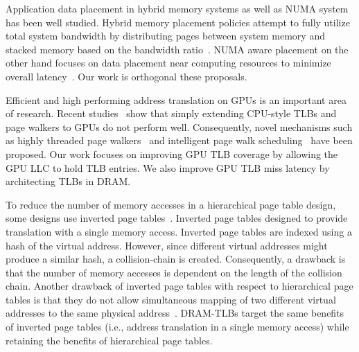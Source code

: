  Application data
placement in hybrid memory systems as well as NUMA system has been
well studied. Hybrid memory placement policies attempt to fully
utilize total system bandwidth by distributing pages between system
memory and stacked memory based on the bandwidth
ratio~\cite{bwa,batman}. NUMA aware placement on the other hand
focuses on data placement near computing resources to minimize overall
latency~\cite{numa-traffic, numa-OSsupport, numa-bolosky}. Our work is
orthogonal these proposals.

 Efficient and
high performing address translation on GPUs is an important area of
research. Recent studies~\cite{power2014supporting, pichaigpu} show
that simply extending CPU-style TLBs and page walkers to GPUs do not
perform well. Consequently, novel mechanisms such as highly threaded
page walkers~\cite{power2014supporting} and intelligent page walk
scheduling~\cite{pichaigpu} have been proposed. Our work focuses on
improving GPU TLB coverage by allowing the GPU LLC to hold TLB
entries. We also improve GPU TLB miss latency by architecting TLBs in
DRAM.

 To reduce the number of memory
accesses in a hierarchical page table design, some designs use
inverted page tables~\cite{invertedPT,invertedPT2}. Inverted page
tables designed to provide translation with a single memory access.
Inverted page tables are indexed using a hash of the virtual address.
However, since different virtual addresses might produce a similar
hash, a collision-chain is created. Consequently, a drawback is that
the number of memory accesses is dependent on the length of the
collision chain. Another drawback of inverted page tables with respect
to hierarchical page tables is that they do not allow simultaneous
mapping of two different virtual addresses to the same physical
address~\cite{invertedPT}. DRAM-TLBs target the same benefits of
inverted page tables (i.e., address translation in a single memory
access) while retaining the benefits of hierarchical page tables.



